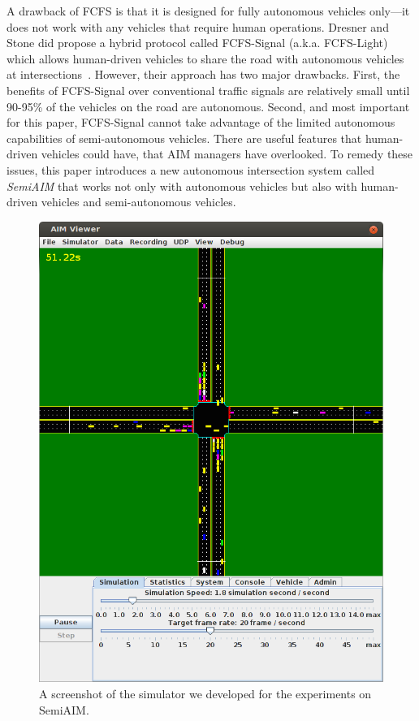 A drawback of FCFS is that it is designed for fully autonomous
vehicles only---it does not work with any vehicles that require human
operations. Dresner and Stone did propose a hybrid protocol called
FCFS-Signal (a.k.a. FCFS-Light) which allows human-driven vehicles to
share the road with autonomous vehicles at
intersections~\cite{bib:Dresner07Sharing}. However, their approach has
two major drawbacks.  First, the benefits of FCFS-Signal over
conventional traffic signals are relatively small until 90-95\% of the
vehicles on the road are autonomous.  Second, and most important for
this paper, FCFS-Signal cannot take advantage of the limited
autonomous capabilities of semi-autonomous vehicles. There are useful
features that human-driven vehicles could have, that AIM managers have
overlooked. To remedy these issues, this paper introduces a new
autonomous intersection system called \emph{SemiAIM} that works not
only with autonomous vehicles but also with human-driven vehicles and
semi-autonomous vehicles.


\begin{figure}
\includegraphics{figures/demo.png}
\vspace{-.1in}
\caption{A screenshot of the simulator we developed for the experiments on
SemiAIM.}
\label{fig:simulator}
\vspace{-.07in}
\end{figure}





